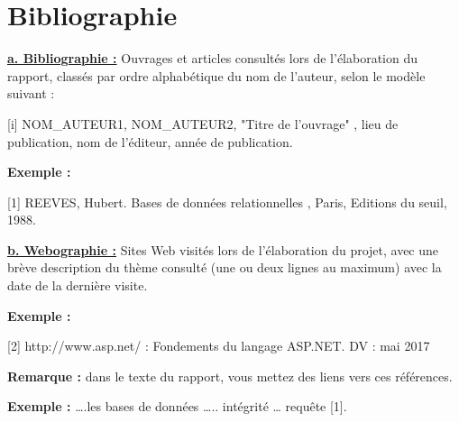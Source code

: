 \chapter*{Bibliographie}
\lhead{}
\textbf{\underline{a. Bibliographie :}} Ouvrages et articles consultés lors de l’élaboration du rapport, classés par ordre alphabétique du nom de l’auteur, selon le modèle suivant :

[i] NOM\_AUTEUR1, NOM\_AUTEUR2,   "Titre de l’ouvrage" , lieu de publication, nom de l’éditeur, année de publication.

\textbf{Exemple :}

[1] REEVES, Hubert.  Bases de données relationnelles , Paris, Editions du seuil, 1988.

\hrulefill

\textbf{ \underline{b. Webographie :} } Sites Web visités lors de l’élaboration du projet, avec une brève description du thème consulté (une ou deux lignes au maximum) avec la date de la dernière visite.

\textbf{Exemple :}

[2] http://www.asp.net/ : Fondements du langage ASP.NET. DV : mai 2017

\hrulefill

\textbf{{\large Remarque :}} dans le texte du rapport, vous mettez des liens vers ces références.

\textbf{Exemple :} ….les bases de données ….. intégrité … requête [1].

%
\newpage

